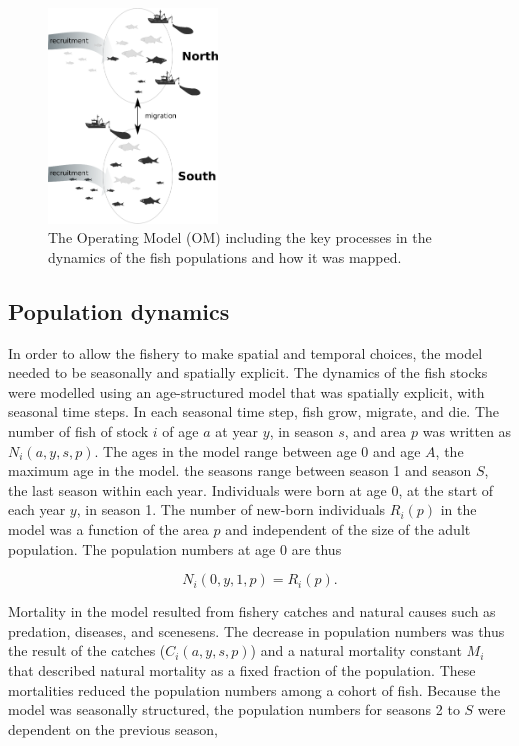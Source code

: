 \documentclass[12pt,oneline,a4paper,numbib]{ouparticle}
\numberwithin{equation}{subsection} %
\begin{document}
\begin{figure}[!h]
\centering
\includegraphics[width=0.4\textwidth]{Figures/Areadynamics.eps} 
\caption{The Operating Model (OM) including the key processes in the dynamics of the fish populations and how it was mapped.}
\label{fig:stockdyn}
\end{figure}

\subsection{Population dynamics}
\label{sec2.1}

In order to allow the fishery to make spatial and temporal choices, the model needed to be seasonally and spatially explicit. The dynamics of the fish stocks were modelled using an age-structured model that was spatially explicit, with seasonal time steps. In each seasonal time step, fish grow, migrate, and die. The number of fish of stock $i$ of age $a$ at year $y$, in season $s$, and area $p$ was written as $N_i (a, y, s, p)$.  The ages in the model range between age 0 and age $A$, the maximum age in the model. the seasons range between season 1 and season $S$, the last season within each year. Individuals were born at age 0, at the start of each year $y$, in season 1. The number of new-born individuals $R_i (p)$ in the model was a function of the area $p$ and independent of the size of the adult population. The population numbers at age 0 are thus
 
\begin{equation}
N_i (0, y, 1, p) = R_i (p).
\end{equation}


Mortality in the model resulted from fishery catches and natural causes such as predation, diseases, and scenesens. The decrease in population numbers was thus the result of the catches ($C_i (a, y, s, p)$) and a natural mortality constant $M_i$ that described natural mortality as a fixed fraction of the population. These mortalities reduced the population numbers among a cohort of fish. Because the model was seasonally structured, the population numbers for seasons 2 to $S$ were dependent on the previous season,
\end{document}
